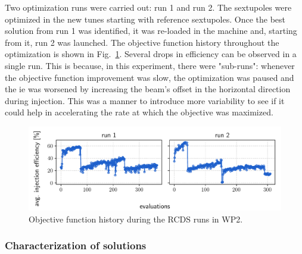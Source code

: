 Two optimization runs were carried out: run 1 and run 2. The sextupoles were optimized in the new tunes starting with reference sextupoles. Once the best solution from run 1 was identified, it was re-loaded in the machine and, starting from it, run 2 was launched. The objective function history throughout the optimization is shown in Fig.~\ref{fig:wp_2_history}. Several drops in efficiency can be observed in a single run. This is because, in this experiment, there were "sub-runs": whenever the objective function improvement was slow, the optimization was paused and the \gls*{ie} was worsened by increasing the beam's offset in the horizontal direction during injection. This was a manner to introduce more variability to see if it could help in accelerating the rate at which the objective was maximized.
\begin{figure}[htb]
    \includegraphics[width=\columnwidth]{Images/wp2_objfunc_hist.pdf}
    \caption[Objective function history during the RCDS runs in WP2.]{Objective function history during the \gls*{RCDS} runs in \gls*{WP2}.}
    \label{fig:wp_2_history}
\end{figure}
\subsubsection{Characterization of solutions}

